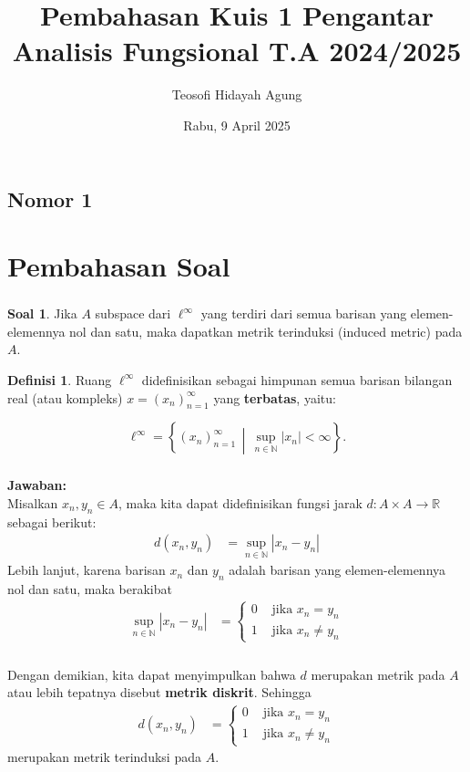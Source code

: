 \documentclass[aspectratio=169]{beamer}
\date{Rabu, 9 April 2025}
\title[Pengantar Analisis Fungsional]{Pembahasan Kuis 1 Pengantar Analisis Fungsional T.A 2024/2025}
\author[Teo]{Teosofi Hidayah Agung}
\institute[Matematika ITS]{Departemen Matematika\\ Institut Teknologi Sepuluh Nopember}
\theoremstyle{definition}
\newtheorem{definisi}{Definisi}
\newtheorem{soal}{Soal}
\begin{document}
    \begin{frame}
        \titlepage
\end{frame}

\subsection{Nomor 1}
\section{Pembahasan Soal}
\begin{frame}
  \frametitle{\insertsection}
  \begin{soal}
    Jika $A$ subspace dari $\ell^\infty$ yang terdiri dari semua barisan yang elemen-elemennya nol dan satu, maka dapatkan metrik terinduksi (induced metric) pada $A$.
  \end{soal}
  \begin{definisi}
    Ruang \( \ell^\infty \) didefinisikan sebagai himpunan semua barisan bilangan real (atau kompleks) \( x = (x_n)_{n=1}^\infty \) yang \textbf{terbatas}, yaitu:

    \[
    \ell^\infty = \left\{ (x_n)_{n=1}^\infty \,\middle|\, \sup_{n \in \mathbb{N}} |x_n| < \infty \right\}.
    \]
    
  \end{definisi}
\end{frame}


\begin{frame}
  \frametitle{\insertsection}
  \framesubtitle{\insertsubsection}
  \textbf{Jawaban:}\\
  Misalkan $x_n, y_n \in A$, maka kita dapat didefinisikan fungsi jarak $d: A \times A \to \mathbb{R}$ sebagai berikut:
  \begin{align*}
    d(x_n, y_n) &= \sup_{n \in \mathbb{N}} |x_n - y_n| 
  \end{align*}
  Lebih lanjut, karena barisan $x_n$ dan $y_n$ adalah barisan yang elemen-elemennya nol dan satu, maka berakibat 
  \begin{align*}
    \sup_{n \in \mathbb{N}} |x_n - y_n| &= \begin{cases}
      0 & \text{ jika } x_n = y_n\\
      1 & \text{ jika } x_n \neq y_n
    \end{cases}
  \end{align*}
\end{frame}

\begin{frame}
  \frametitle{\insertsection}
  \framesubtitle{\insertsubsection}
  Dengan demikian, kita dapat menyimpulkan bahwa $d$ merupakan metrik pada $A$ atau lebih tepatnya disebut \textbf{metrik diskrit}. Sehingga
  \begin{align*}
    d(x_n, y_n) &= \begin{cases}
      0 & \text{ jika } x_n = y_n\\
      1 & \text{ jika } x_n \neq y_n
    \end{cases}
  \end{align*}
  merupakan metrik terinduksi pada $A$.
\end{frame}
\end{document}
